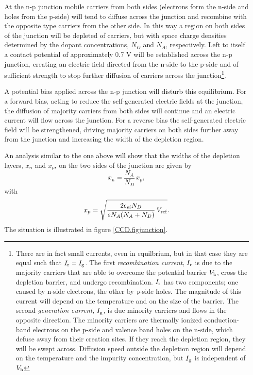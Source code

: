 At the n-p junction mobile carriers from both sides (electrons form
the n-side and holes from the p-side) will tend to diffuse across the
junction and recombine with the opposite type carriers from the other
side. In this way a region on both sides of the junction will be
depleted of carriers, but with space charge densities determined by
the dopant concentrations, $N_D$ and $N_A$, respectively. Left to
itself a contact potential of approximately 0.7 V will be established
across the n-p junction, creating an electric field directed from the
n-side to the p-side and of sufficient strength to stop further
diffusion of carriers across the junction\footnote{There are in fact
  small currents, even in equilbrium, but in that case they are equal
  such that $I_{\rm r}=I_{\rm g}$. The first {\it recombination
    current}, $I_{\rm r}$ is due to the majority carriers that are
  able to overcome the potential barrier $V_{\rm b}$, cross the
  depletion barrier, and undergo recombination. $I_{\rm r}$ has two
  components; one caused by n-side electrons, the other by p-side
  holes. The magnitude of this current will depend on the temperature
  and on the size of the barrier. The second {\it generation current},
  $I_{\rm g}$, is due minority carriers and flows in the opposite
  direction. The minority carriers are thermally ionized
  conduction-band electrons on the p-side and valence band holes on
  the n-side, which defuse away from their creation sites. If they
  reach the depletion region, they will be swept across. Diffusion
  speed outside the depletion region will depend on the temperature
  and the impurity concentration, but $I_{\rm g}$ is independent of $V_{\rm b}$}.

A potential bias applied across the n-p junction will disturb this
equilibrium. For a forward bias, acting to reduce the self-generated
electric fields at the junction, the diffusion of majority carriers
from both sides will continue and an electric current will flow across
the junction. For a reverse bias the self-generated electric field
will be strengthened, driving majority carriers on both sides further
away from the junction and increasing the width of the depletion
region.

An analysis similar to the one above will show that the widths of the
depletion layers, $x_n$ and $x_p$, on the two sides of the junction
are given by
\begin{equation}
  x_n = \frac{N_A}{N_D} \, x_p,
 \label{eq:npjunction1}
\end{equation}
with
\begin{equation}
  x_p = \sqrt{\frac{2\epsilon_{si} N_D}{eN_A(N_A+N_D)} \, V_{\rm ref}}. 
 \label{eq:npjunction2}
\end{equation}
The situation is illustrated in figure \ref{CCD.figjunction}.

